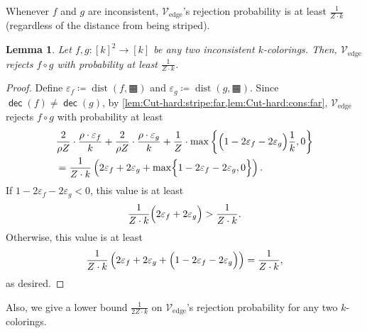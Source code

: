 \documentclass[11pt,fleqn]{article}
\renewcommand{\epsilon}{\varepsilon}
\newcommand{\defeq}{\coloneq}
\DeclareMathOperator{\rHam}{\mathrm{dist}}
\DeclareMathOperator{\dec}{\mathsf{dec}}
\newcommand{\V}{\calV}
\newcommand{\f}{f}
\newcommand{\g}{g}
\newcommand{\str}{\squarehvfill}
\newcommand{\Vedge}{\V_\mathrm{edge}}
\newcommand{\calV}{\mathcal{V}}
\newtheorem{lemma}[theorem]{Lemma}
\theoremstyle{definition}
\numberwithin{equation}{section}
\begin{document}
Whenever $\f$ and $\g$ are inconsistent,
$\Vedge$'s rejection probability is at least $\frac{1}{Z \cdot k}$
(regardless of the distance from being striped).


\begin{lemma}
\label{lem:Cut-hard:edge:mismatch}
    Let $\f,\g \colon [k]^2 \to [k]$ be any two inconsistent $k$-colorings.
    Then, $\Vedge$ rejects $\f \circ \g$ with probability at least
    $\frac{1}{Z \cdot k}$.
\end{lemma}
\begin{proof} Define
    $\epsilon_{\f} \defeq \rHam(\f, \str)$ and
    $\epsilon_{\g} \defeq \rHam(\g, \str)$.
Since $\dec(\f) \neq \dec(\g)$,
by \cref{lem:Cut-hard:stripe:far,lem:Cut-hard:cons:far},
$\Vedge$ rejects $\f \circ \g$ with probability at least
\begin{align}
\begin{aligned}
    & \frac{2}{\rho Z} \cdot \frac{\rho \cdot \epsilon_{\f}}{k}
        + \frac{2}{\rho Z} \cdot \frac{\rho \cdot \epsilon_{\g}}{k}
        + \frac{1}{Z} \cdot \max\left\{
            \Bigl(1-2\epsilon_{\f} -2\epsilon_{\g} \Bigr)\frac{1}{k}, 0
        \right\}
    \\
    & = \frac{1}{Z\cdot k} \left(  
        2\epsilon_{\f} + 2\epsilon_{\g}
        + \max\Bigl\{
            1-2\epsilon_{\f} -2\epsilon_{\g}, 0
        \Bigr\}
    \right).
\end{aligned}
\end{align}
If $1-2\epsilon_{\f} -2\epsilon_{\g} < 0$,
this value is at least
\begin{align}
    \frac{1}{Z\cdot k} \Bigl(  
        2\epsilon_{\f} + 2\epsilon_{\g}
    \Bigr)
    > \frac{1}{Z \cdot k}.
\end{align}
Otherwise, this value is at least
\begin{align}
    \frac{1}{Z\cdot k} \left(  
        2\epsilon_{\f} + 2\epsilon_{\g}
        + \Bigl(1-2\epsilon_{\f} -2\epsilon_{\g} \Bigr)
    \right)
    = \frac{1}{Z \cdot k},
\end{align}
as desired.
\end{proof}


Also, we give a lower bound $\frac{1}{2Z \cdot k}$ on $\Vedge$'s rejection probability for any two $k$-colorings.
\end{document}
